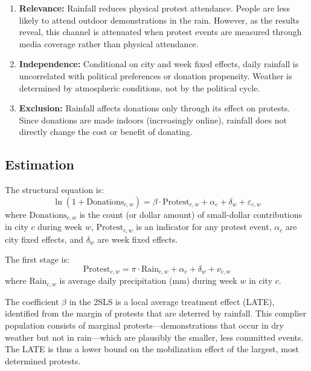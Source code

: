 \documentclass[12pt]{article}
\begin{document}
\begin{enumerate}
    \item \textbf{Relevance:} Rainfall reduces physical protest attendance. People are less likely to attend outdoor demonstrations in the rain. However, as the results reveal, this channel is attenuated when protest events are measured through media coverage rather than physical attendance.
    \item \textbf{Independence:} Conditional on city and week fixed effects, daily rainfall is uncorrelated with political preferences or donation propensity. Weather is determined by atmospheric conditions, not by the political cycle.
    \item \textbf{Exclusion:} Rainfall affects donations only through its effect on protests. Since donations are made indoors (increasingly online), rainfall does not directly change the cost or benefit of donating.
\end{enumerate}

\subsection{Estimation}

The structural equation is:
\begin{equation}
\ln(1 + \text{Donations}_{c,w}) = \beta \cdot \text{Protest}_{c,w} + \alpha_c + \delta_w + \varepsilon_{c,w}
\label{eq:structural}
\end{equation}
where $\text{Donations}_{c,w}$ is the count (or dollar amount) of small-dollar contributions in city $c$ during week $w$, $\text{Protest}_{c,w}$ is an indicator for any protest event, $\alpha_c$ are city fixed effects, and $\delta_w$ are week fixed effects.

The first stage is:
\begin{equation}
\text{Protest}_{c,w} = \pi \cdot \text{Rain}_{c,w} + \alpha_c + \delta_w + \nu_{c,w}
\label{eq:firststage}
\end{equation}
where $\text{Rain}_{c,w}$ is average daily precipitation (mm) during week $w$ in city $c$.

The coefficient $\beta$ in the 2SLS is a local average treatment effect (LATE), identified from the margin of protests that are deterred by rainfall. This complier population consists of marginal protests---demonstrations that occur in dry weather but not in rain---which are plausibly the smaller, less committed events. The LATE is thus a lower bound on the mobilization effect of the largest, most determined protests.
\end{document}
